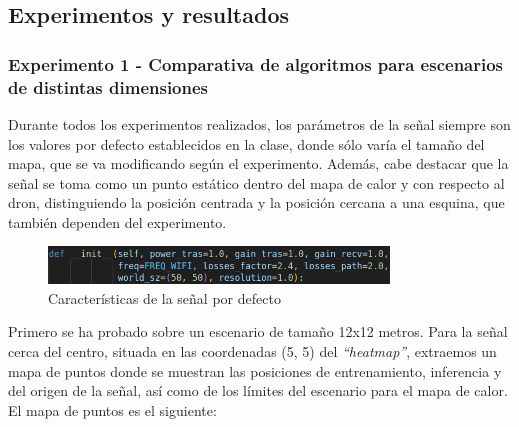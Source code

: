 \subsection{Experimentos y resultados}
\label{subsec:experimentos_sf}

\subsubsection{Experimento 1 - Comparativa de algoritmos para escenarios de distintas dimensiones}
\label{subsubsec:experimentos_1}

Durante todos los experimentos realizados, los parámetros de la señal siempre son los valores por defecto establecidos en la clase, donde sólo varía el tamaño del mapa, que se va modificando según el experimento. Además, cabe destacar que la señal se toma como un punto estático dentro del mapa de calor y con respecto al dron, distinguiendo la posición centrada y la posición cercana a una esquina, que también dependen del experimento.\\

\begin{figure} [H]
    \begin{center}
    \includegraphics[height=1cm]{imagenes/cap4/16_default_values.png}
    \end{center}
    \caption[Características de la señal por defecto]{Características de la señal por defecto}
    \label{fig:compare_graph}
\end{figure}

Primero se ha probado sobre un escenario de tamaño 12x12 metros. Para la señal cerca del centro, situada en las coordenadas (5, 5) del \emph{``heatmap''}, extraemos un mapa de puntos donde se muestran las posiciones de entrenamiento, inferencia y del origen de la señal, así como de los límites del escenario para el mapa de calor. El mapa de puntos es el siguiente:\\

